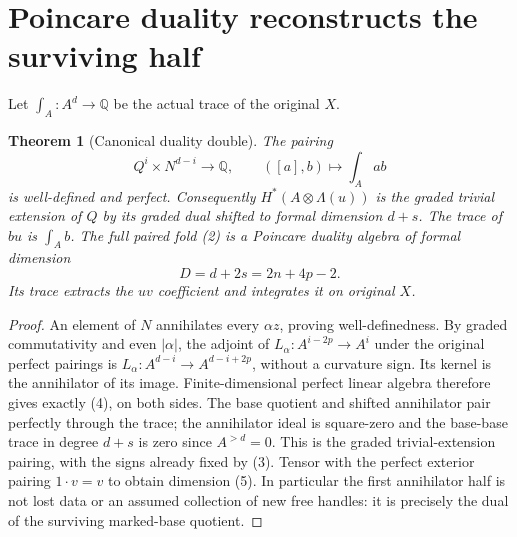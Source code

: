 \documentclass[11pt]{article}
\newtheorem{theorem}{Theorem}
\newcommand{\Q}{\mathbb Q}
\begin{document}
\section{Poincare duality reconstructs the surviving half}
Let $\int_A:A^d\to\Q$ be the actual trace of the original $X$.
\begin{theorem}[Canonical duality double]\label{thm:double}
The pairing
\[
 Q^i\times N^{d-i}\longrightarrow\Q,\qquad
 ([a],b)\longmapsto\int_A ab                                  \tag{4}
\]
is well-defined and perfect. Consequently $H^*(A\otimes\Lambda(u))$
is the graded trivial extension of $Q$ by its graded dual shifted to
formal dimension $d+s$. The trace of $bu$ is $\int_A b$.
The full paired fold (2) is a Poincare duality algebra of formal dimension
\[
                         D=d+2s=2n+4p-2.                       \tag{5}
\]
Its trace extracts the $uv$ coefficient and integrates it on original $X$.
\end{theorem}
\begin{proof}
An element of $N$ annihilates every $\alpha z$, proving well-definedness.
By graded commutativity and even $|\alpha|$, the adjoint of
$L_\alpha:A^{i-2p}\to A^i$ under the original perfect pairings is
$L_\alpha:A^{d-i}\to A^{d-i+2p}$, without a curvature sign.
Its kernel is the annihilator of its image. Finite-dimensional perfect
linear algebra therefore gives exactly (4), on both sides. The base
quotient and shifted annihilator pair perfectly through the trace; the
annihilator ideal is square-zero and the base-base trace in degree $d+s$
is zero since $A^{>d}=0$. This is the graded trivial-extension pairing,
with the signs already fixed by (3). Tensor with the perfect exterior
pairing $1\cdot v=v$ to obtain dimension (5). In particular the first
annihilator half is not lost data or an assumed collection of new free
handles: it is precisely the dual of the surviving marked-base quotient.
\end{proof}
\end{document}
